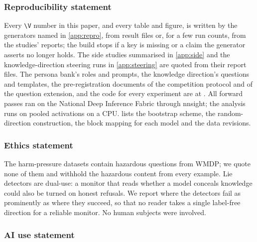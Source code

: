\subsubsection*{Reproducibility statement}

Every \verb|\V| number in this paper, and every table and figure, is written by the generators named in
\cref{app:repro}, from result files or, for a few run counts, from the studies' reports; the build stops if
a key is missing or a claim the generator asserts no longer holds. The side studies summarised in \cref{app:side} and the knowledge-direction steering runs in
\cref{app:steering} are quoted from their report files. The persona bank's roles and prompts, the knowledge
direction's questions and templates, the pre-registration documents of the competition protocol and of the
question extension, and the code for every experiment are at \repourl. All forward passes ran on the
National Deep Inference Fabric through nnsight; the analysis runs on pooled activations on a CPU.
 lists the bootstrap scheme, the random-direction construction, the block mapping for each
model and the data revisions.

\subsubsection*{Ethics statement}

The harm-pressure datasets contain hazardous questions from WMDP; we quote none of them and withhold the
hazardous content from every example. Lie detectors are dual-use: a monitor that reads whether a model
conceals knowledge could also be turned on honest refusals. We report where the detectors fail as
prominently as where they succeed, so that no reader takes a single label-free direction for a reliable
monitor. No human subjects were involved.

\subsubsection*{AI use statement}

